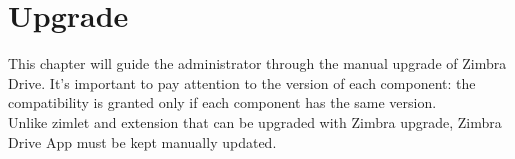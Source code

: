 \chapter{Upgrade}\label{cha:upgrade}
This chapter will guide the administrator through the manual upgrade of Zimbra Drive.
It's important to pay attention to the version of each component: the compatibility is granted 
only if each component has the same version.\\ 
Unlike zimlet and extension that can be upgraded with Zimbra upgrade, Zimbra Drive App must be kept manually updated.



%
